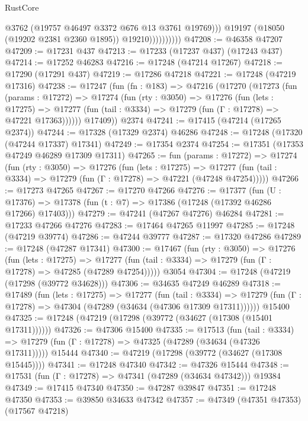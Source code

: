 \begin{lexlean}{RustCore}
\begin{coremodule}
                            @3762
                            (@19757 @46497 @3372 @676 @13 @3761 @19769)))
                        @19197
                        (@18050 (@19202 @2381 @2360 @1895))
                        @19210))))))))))
@47208 := @46358 @47207
@47209 := @17231 @437
@47213 := @17233 (@17237 @437) (@17243 @437)
@47214 := @17252 @46283
@47216 := @17248 (@47214 @17267)
@47218 := @17290 (@17291 @437)
@47219 := @17286 @47218
@47221 := @17248 (@47219 @17316)
@47238 := @17247
    (fun (fn : @183) =>
    @47216
      (@17270
        (@17273
          (fun (params : @17272) =>
          @17274
            (fun (rty : @3050) =>
            @17276
              (fun (lets : @17275) =>
              @17277 (fun (tail : @3334) => @17279 (fun (Γ : @17278) => @47221 @17363))))))
        @17409))
    @2374
@47241 := @17415 (@47214 (@17265 @2374))
@47244 := @17328 (@17329 @2374) @46286
@47248 := @17248 (@17320 (@47244 @17337) @17341)
@47249 := @17354 @2374
@47254 := @17351 (@17353 @47249 @46289 @17309 @17311)
@47265 := fun (params : @17272) =>
  @17274
    (fun (rty : @3050) =>
    @17276
      (fun (lets : @17275) =>
      @17277 (fun (tail : @3334) => @17279 (fun (Γ : @17278) => @47221 (@47248 @47254)))))
@47266 := @17273 @47265
@47267 := @17270 @47266
@47276 := @17377
    (fun (U : @17376) => @17378 (fun (t : @7) => @17386 (@17248 (@17392 @46286 @17266) @17403)))
@47279 := @47241 (@47267 @47276) @46284
@47281 := @17233 @47266 @47276
@47283 := @17464 @47265 @11997
@47285 := @17248 (@47219 @39774)
@47286 := @47244 @39777
@47287 := @17320 @47286
@47289 := @17248 (@47287 @17341)
@47300 := @17467
    (fun (rty : @3050) =>
    @17276
      (fun (lets : @17275) =>
      @17277 (fun (tail : @3334) => @17279 (fun (Γ : @17278) => @47285 (@47289 @47254)))))
    @3054
@47304 := @17248 (@47219 (@17298 (@39772 @34628)))
@47306 := @34635 @47249 @46289
@47318 := @17489
    (fun (lets : @17275) =>
    @17277
      (fun (tail : @3334) =>
      @17279 (fun (Γ : @17278) => @47304 (@47289 (@34634 (@47306 @17309 @17311))))))
    @15400
@47325 := @17248 (@47219 (@17298 (@39772 (@34627 (@17308 (@15401 @17311))))))
@47326 := @47306 @15400
@47335 := @17513
    (fun (tail : @3334) => @17279 (fun (Γ : @17278) => @47325 (@47289 (@34634 (@47326 @17311)))))
    @15444
@47340 := @47219 (@17298 (@39772 (@34627 (@17308 @15445))))
@47341 := @17248 @47340
@47342 := @47326 @15444
@47348 := @17531 (fun (Γ : @17278) => @47341 (@47289 (@34634 @47342))) @19384
@47349 := @17415 @47340
@47350 := @47287 @39847
@47351 := @17248 @47350
@47353 := @39850 @34633 @47342
@47357 := @47349 (@47351 @47353) (@17567 @47218)

\end{coremodule}
\end{lexlean}
